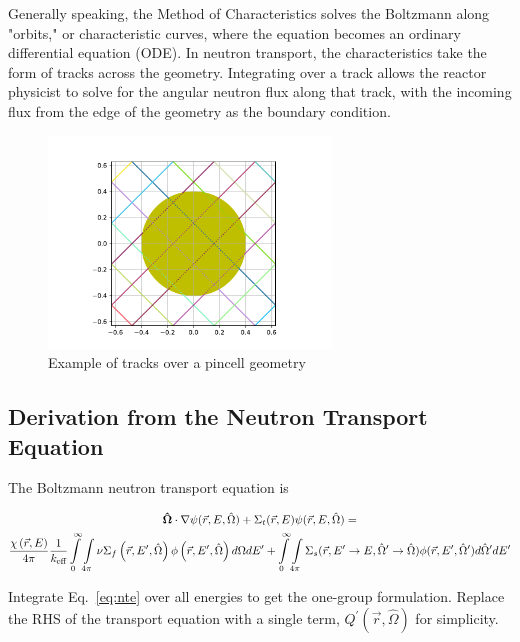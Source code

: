 \documentclass[12pt]{article}
\begin{document}
Generally speaking, the Method of Characteristics solves the Boltzmann along "orbits," or characteristic curves, where the equation becomes an ordinary differential equation (ODE). In neutron transport, the characteristics take the form of tracks across the geometry. Integrating over a track allows the reactor physicist to solve for the angular neutron flux along that track, with the incoming flux from the edge of the geometry as the boundary condition.

\begin{figure}[h]
\centering
\includegraphics[width=0.67\textwidth]{figs/Tracks.pdf}
\caption{Example of tracks over a pincell geometry}
\label{fig:characteristics}
\end{figure}


\subsection{Derivation from the Neutron Transport Equation}\label{sec:derivation}

The Boltzmann neutron transport equation is

\begin{gather}\label{eq:nte}
\mathbf{\hat{\Omega}}\cdot\nabla \psi(\vec{r},E,{\hat{\Omega}}) +
\Sigma_{t} (\vec{r},E) \psi(\vec{r},E,\hat{\Omega}) = \cr
\frac{\chi \left(\vec{r}, E \right)}{4\pi} \frac{1}{k_\text{eff}}
\int\limits_0^{\infty} \int\limits_{4\pi}
\nu\Sigma_f \left(\vec{r}, E^{\prime}, \hat{\Omega} \right)
\phi \left( \vec{r}, E^{\prime}, \hat{\Omega} \right) d\Omega dE^{\prime}  + 
\int\limits^{\infty}_{0} \int\limits_{4\pi}
\Sigma_s(\vec{r}, E^\prime \rightarrow E,  \hat{\Omega}^\prime \rightarrow \hat{\Omega})
\phi(\vec{r},E^\prime, \hat{\Omega}^\prime) d\hat{\Omega}^\prime dE^\prime 
\end{gather}

Integrate Eq.~\ref{eq:nte} over all energies to get the one-group formulation. Replace the RHS of the transport equation with a single term, $Q^\prime (\vec{r}, \hat{\Omega})$ for simplicity.
\end{document}
